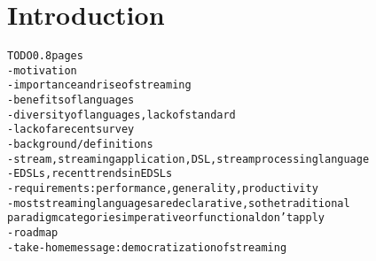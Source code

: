 \section{Introduction}\label{sec:introduction}

\begin{alltt}TODO\scriptsize 0.8 pages
- motivation
  - importance and rise of streaming
  - benefits of languages
  - diversity of languages, lack of standard
  - lack of a recent survey
- background / definitions
  - stream, streaming application, DSL, stream processing language
  - EDSLs \cite{hudak_1998}, recent trends in EDSLs
  - requirements: performance, generality, productivity
  - most streaming languages are declarative, so the traditional
    paradigm categories imperative or functional don't apply
- roadmap
- take-home message: democratization of streaming
\end{alltt}
